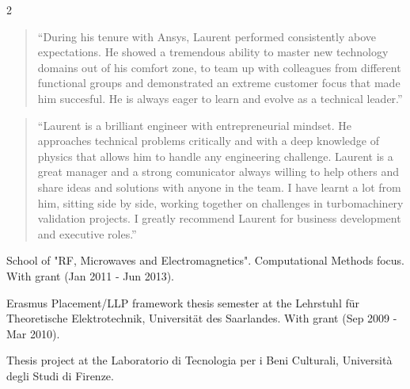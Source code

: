 \documentclass[9pt,a4paper,ragged2e,withhyper]{altacv} %
\begin{document}
\begin{paracol}{2}

\begin{quotation}
    ``During his tenure with Ansys, Laurent performed consistently above expectations. He showed a tremendous ability to master new technology domains out of his comfort zone, to team up with colleagues from different functional groups and demonstrated an extreme customer focus that made him succesful. He is always eager to learn and evolve as a technical leader.''
\end{quotation}

\medskip

\begin{quotation}
  ``Laurent is a brilliant engineer with entrepreneurial mindset. He approaches technical problems critically and with a deep knowledge of physics that allows him to handle any engineering challenge. Laurent is a great manager and a strong comunicator always willing to help others and share ideas and solutions with anyone in the team. I have learnt a lot from him, sitting side by side, working together on challenges in turbomachinery validation projects. I greatly recommend Laurent for business development and executive roles.''
\end{quotation}


\switchcolumn

School of "RF, Microwaves and Electromagnetics". Computational Methods focus. With grant (Jan 2011 - Jun 2013).

\divider

Erasmus Placement/LLP framework thesis semester at the Lehrstuhl für Theoretische Elektrotechnik, Universität des Saarlandes. With grant (Sep 2009 - Mar 2010).

\divider

Thesis project at the Laboratorio di Tecnologia per i Beni Culturali, Università degli Studi di Firenze.


\end{paracol}
\end{document}
